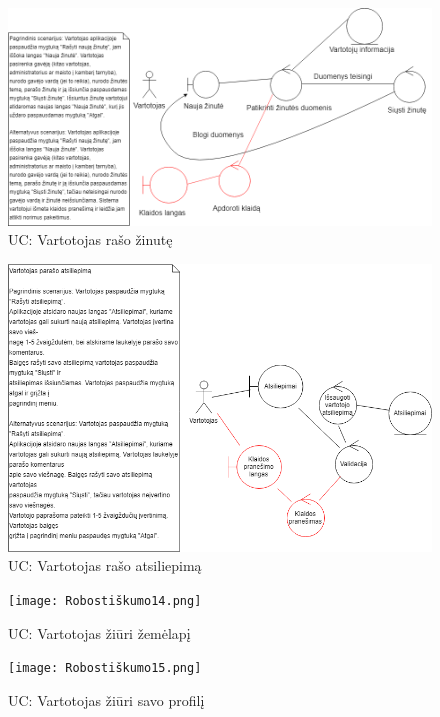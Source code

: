 \documentclass[oneside]{VUMIFPSkursinis}
\begin{document}
\begin{figure}[h]
    \centering
    \includegraphics[width=1.0\textwidth]{Rob11.png}
    \caption{UC: Vartotojas rašo žinutę}
    \label{fig:rob11}
\end{figure}
\vskip 1cm

\begin{figure}[h]
    \centering
    \includegraphics[width=1.0\textwidth]{rob12.png}
    \caption{UC: Vartotojas rašo atsiliepimą}
    \label{fig:rob12}
\end{figure}
\vskip 1cm

\begin{figure}[h]
    \centering
    \texttt{[image: Robostiškumo14.png]}
    \caption{UC: Vartotojas žiūri žemėlapį}
    \label{fig:rob14}
\end{figure}
\vskip 1cm

\begin{figure}[h]
    \centering
    \texttt{[image: Robostiškumo15.png]}
    \caption{UC: Vartotojas žiūri savo profilį}
    \label{fig:rob15}
\end{figure}
\vskip 1cm
\end{document}
